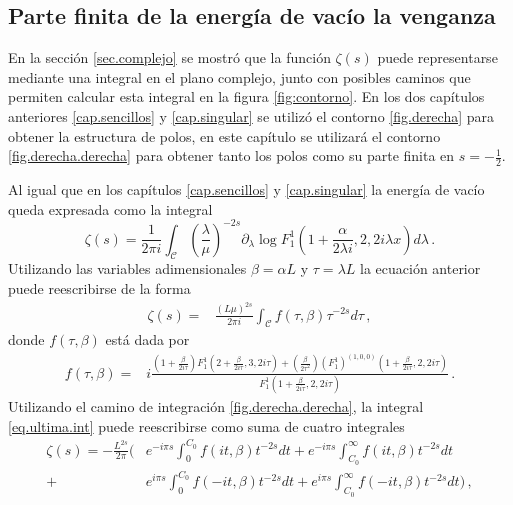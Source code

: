 \subsection{Parte finita de la energía de vacío la venganza }

En la sección \ref{sec.complejo} se mostró que la función $\zeta (s)$ puede representarse mediante una integral en el plano complejo, junto con posibles caminos que permiten calcular esta integral en la figura \ref{fig:contorno}. En los dos capítulos anteriores \ref{cap.sencillos}  y \ref{cap.singular} se utilizó el contorno \ref{fig.derecha} para obtener la estructura de polos, en este capítulo se utilizará el contorno \ref{fig.derecha.derecha} para obtener tanto los polos como su parte finita en $s = - \frac{1}{2}$.

Al igual que en los capítulos \ref{cap.sencillos}  y \ref{cap.singular} la energía de vacío queda expresada como la integral
\begin{equation}
	\zeta (s) = 
	\frac{1}{2 \pi i} \int _{\mathcal{C}} 
						\left( \frac{\lambda}{\mu} \right) ^{-2s}
						\partial _ \lambda 
						\log F _1 ^{1} 
						\left( 1+\frac{ \alpha}{2 \lambda i },
							2,2 i \lambda x 
							\right)												
						d \lambda
	\, .
\end{equation}
Utilizando las variables adimensionales $\beta = \alpha L$ y  $\tau = \lambda L$ la ecuación anterior puede reescribirse de la forma
\begin{align}
\label{eq.ultima.int}
	\zeta (s) =& 
	\frac{\left(L \mu \right)^{2s}}{2 \pi i} \int _{\mathcal{C}} 
	f (\tau , \beta) \tau ^{-2s} d \tau 
\, ,
\end{align}
donde $f( \tau, \beta)$ está dada por
\begin{align}
f(\tau, \beta) =& 	
i
\frac{
		\left(1 + \frac{ \beta}{2 i \tau} \right) 
		F _1 ^1 
			\left( 2 + \frac{ \beta}{2 i \tau} ,3 ,2 i \tau \right)
		+ \left( \frac{\beta				
				}
				{2 \tau ^2 } 
				\right)
				( F _{1} ^1 ) ^{(1,0,0)}
				\left( 1 + \frac{\beta}{2 i \tau} ,2 ,2 i \tau
						\right)
		}
		{F _1 ^1 \left( 1 + \frac{\beta}{2 i \tau},2,2 i \tau \right)} 
\, .		
\nonumber
\end{align}
Utilizando el camino de integración \ref{fig.derecha.derecha}, la integral \ref{eq.ultima.int} puede reescribirse como suma de cuatro integrales
\begin{align*}
\zeta (s) = 
- \frac{L ^{2s}}{2 \pi } 
\Bigg(&	  e ^{- i \pi s} \int _0 ^{C _0}
			f (i t,\beta )
			t ^{-2s}  dt 
		+ e ^{- i \pi s} \int _{C _0} ^{\infty}
			f (i t,\beta )
			t ^{-2s}  dt \\
		+&e ^{i \pi s} \int _{0} ^{C _0} 
			f (-i t,\beta )
			t ^{-2s}  dt 
		+ e ^{i \pi s} \int _{C _0} ^{\infty}
			f (-i t,\beta )
			t ^{-2s}  dt 
	\Bigg)
\, ,
\end{align*}
